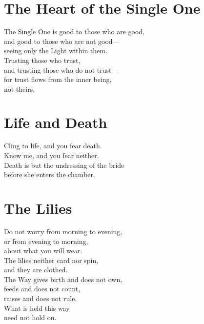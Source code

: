 \documentclass[10pt, openright]{book}
\newcommand{\sectionbreak}{\filbreak}
\newcommand{\sayingsource}[1]{\par\nopagebreak\vspace{0.3\baselineskip}{\raggedleft\footnotesize\itshape #1\par}}
\begin{document}
\sayingsource{Tao Te Ching 48}

\sectionbreak

\section{The Heart of the Single One}\label{the-heart-of-the-single-one}

The Single One is good to those who are good,\\
and good to those who are not good---\\
seeing only the Light within them.\\
Trusting those who trust,\\
and trusting those who do not trust---\\
for trust flows from the inner being,\\
not theirs.

\sayingsource{Tao Te Ching 49 · Matthew 5:45}

\sectionbreak

\section{Life and Death}\label{life-and-death}

Cling to life, and you fear death.\\
Know me, and you fear neither.\\
Death is but the undressing of the bride\\
before she enters the chamber.

\sayingsource{Tao Te Ching 50 · Philip}

\sectionbreak

\section{The Lilies}\label{the-lilies}

Do not worry from morning to evening,\\
or from evening to morning,\\
about what you will wear.\\
The lilies neither card nor spin,\\
and they are clothed.\\
The Way gives birth and does not own,\\
feeds and does not count,\\
raises and does not rule.\\
What is held this way\\
need not hold on.
\end{document}
